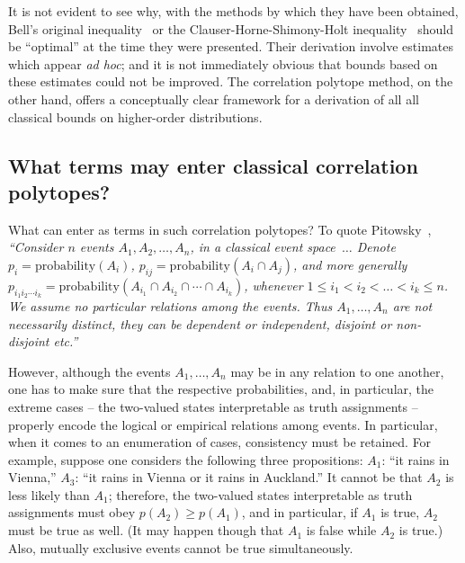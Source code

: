 It is not evident to see why, with the methods by which they have been obtained, Bell's original inequality~\cite{bell-66,Bell-71}
or the Clauser-Horne-Shimony-Holt inequality~\cite{chsh} should be ``optimal'' at the time they were presented.
Their derivation involve estimates which appear {\em ad hoc}; and it is not immediately obvious that bounds based on these estimates
could not be improved.
The correlation polytope method, on the other hand, offers a conceptually clear framework for a derivation of all all classical bounds on
higher-order distributions.

\subsection{What terms may enter classical correlation polytopes?}
\label{2017-b-wtmeccp}


What can enter as terms in such correlation polytopes?
To quote Pitowsky~\cite[p.~38]{pitowsky-89a},
{\em ``Consider $n$ events $A_1 , A_2, \ldots ,A_n$, in a classical event
space~$\ldots$
Denote
$p_i = \text{probability} (A_i)$,
$p_{ij} = \text{probability} (A_i \cap A_j)$,
and more generally
$p_{{i_1}{i_2}\cdots {i_k}} = \text{probability} \left (   A_{i_1} \cap A_{i_2} \cap \cdots  \cap  A_{i_k} \right)$,
whenever $1 \le i_1 < i_2 < \ldots < i_k \le n$.
We assume no particular relations among the events. Thus $A_1 ,  \ldots ,A_n$ are not
necessarily distinct, they can be dependent or independent, disjoint or non-disjoint
etc.''}

However, although the events $A_1 , \ldots ,A_n$ may be in any  relation to one another, one has to make sure that
the respective probabilities, and, in particular, the extreme cases -- the two-valued states interpretable as truth assignments
 --
properly encode the logical or empirical relations among events. In particular, when it comes to an enumeration of cases, consistency must be retained.
For example, suppose one considers the following three
propositions:
$A_1$: ``it rains in Vienna,''
$A_3$: ``it rains in Vienna or it rains in Auckland.''
It cannot be that $A_2$ is less likely than $A_1$;
therefore, the two-valued states interpretable as truth assignments must obey
$p(A_2) \ge p(A_1)$, and in particular, if $A_1$ is true, $A_2$ must be true as well.
(It may happen though that $A_1$ is false while $A_2$ is true.)
Also, mutually exclusive events cannot be true simultaneously.



